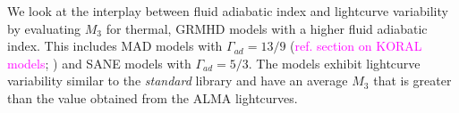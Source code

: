 We look at the interplay between fluid adiabatic index and lightcurve variability by evaluating $M_{3}$ for thermal, GRMHD models with a higher fluid adiabatic index. This includes MAD models with $\Gamma_{ad}=13/9$ (\textcolor{magenta}{ref. section on KORAL models}; \citealt{2021arXiv210812380N}) and SANE models with $\Gamma_{ad}=5/3$. The models exhibit lightcurve variability similar to the \textit{standard} library and have an average $M_{3}$ that is greater than the value obtained from the ALMA lightcurves.
